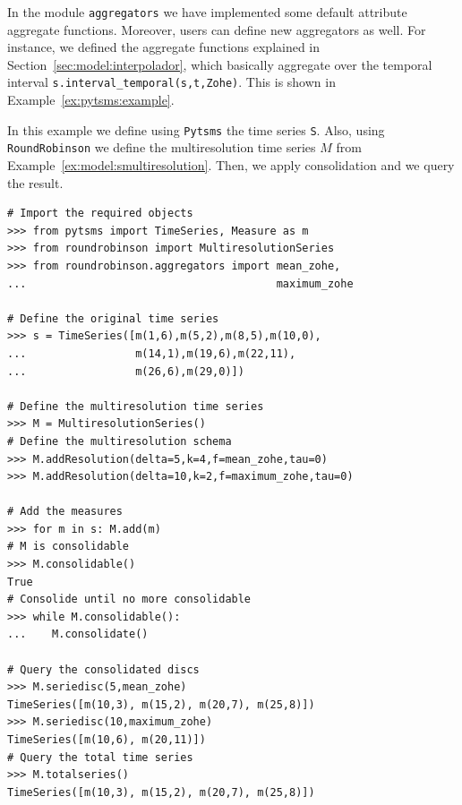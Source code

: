 In the module \texttt{aggregators} we have implemented some default
attribute aggregate functions. Moreover, users can define new
aggregators as well. For instance, we defined the \zohe{} aggregate
functions explained in Section~\ref{sec:model:interpolador}, which
basically aggregate over the temporal interval
\verb|s.interval_temporal(s,t,Zohe)|. This is shown in
Example~\ref{ex:pytsms:example}.


\begin{example}
  In this example we define using \texttt{Pytsms} the time series
  \texttt{S}. Also, using \texttt{RoundRobinson} we define the
  multiresolution time series $M$ from
  Example~\ref{ex:model:smultiresolution}. Then, we apply
  consolidation and we query the result.

{\small
\begin{verbatim}
# Import the required objects
>>> from pytsms import TimeSeries, Measure as m
>>> from roundrobinson import MultiresolutionSeries
>>> from roundrobinson.aggregators import mean_zohe,
...                                       maximum_zohe

# Define the original time series
>>> s = TimeSeries([m(1,6),m(5,2),m(8,5),m(10,0),
...                 m(14,1),m(19,6),m(22,11),
...                 m(26,6),m(29,0)])

# Define the multiresolution time series
>>> M = MultiresolutionSeries()
# Define the multiresolution schema
>>> M.addResolution(delta=5,k=4,f=mean_zohe,tau=0)
>>> M.addResolution(delta=10,k=2,f=maximum_zohe,tau=0)

# Add the measures
>>> for m in s: M.add(m)
# M is consolidable
>>> M.consolidable()
True
# Consolide until no more consolidable
>>> while M.consolidable():
...    M.consolidate()

# Query the consolidated discs 
>>> M.seriedisc(5,mean_zohe)
TimeSeries([m(10,3), m(15,2), m(20,7), m(25,8)])
>>> M.seriedisc(10,maximum_zohe)
TimeSeries([m(10,6), m(20,11)])
# Query the total time series
>>> M.totalseries()
TimeSeries([m(10,3), m(15,2), m(20,7), m(25,8)])
\end{verbatim}
}
\end{example}






